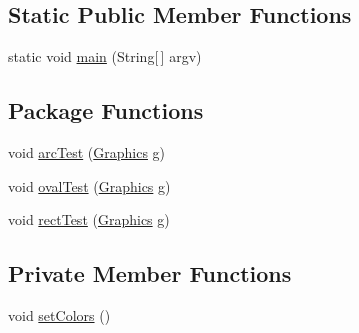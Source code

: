 \subsection*{Static Public Member Functions}
\begin{DoxyCompactItemize}
\item 
static void \mbox{\hyperlink{classorg_1_1newdawn_1_1slick_1_1tests_1_1_geom_accuracy_test_acd4992fa42ec0a20df0915ceb73fc400}{main}} (String\mbox{[}$\,$\mbox{]} argv)
\end{DoxyCompactItemize}
\subsection*{Package Functions}
\begin{DoxyCompactItemize}
\item 
void \mbox{\hyperlink{classorg_1_1newdawn_1_1slick_1_1tests_1_1_geom_accuracy_test_ada59c50af8421f5dc9c146ed5c562dfb}{arc\+Test}} (\mbox{\hyperlink{classorg_1_1newdawn_1_1slick_1_1_graphics}{Graphics}} g)
\item 
void \mbox{\hyperlink{classorg_1_1newdawn_1_1slick_1_1tests_1_1_geom_accuracy_test_abd5a4ec899e7ccd77fc50de593b42fbf}{oval\+Test}} (\mbox{\hyperlink{classorg_1_1newdawn_1_1slick_1_1_graphics}{Graphics}} g)
\item 
void \mbox{\hyperlink{classorg_1_1newdawn_1_1slick_1_1tests_1_1_geom_accuracy_test_a4e834ec4ced988049195453501f4f994}{rect\+Test}} (\mbox{\hyperlink{classorg_1_1newdawn_1_1slick_1_1_graphics}{Graphics}} g)
\end{DoxyCompactItemize}
\subsection*{Private Member Functions}
\begin{DoxyCompactItemize}
\item 
void \mbox{\hyperlink{classorg_1_1newdawn_1_1slick_1_1tests_1_1_geom_accuracy_test_a1ac89c93b981e42acf9fe705bfb46461}{set\+Colors}} ()
\end{DoxyCompactItemize}
